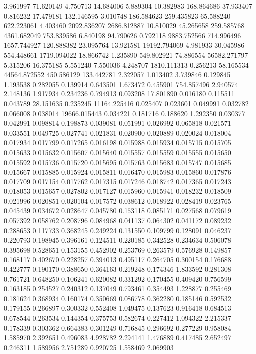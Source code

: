 3.961997
71.620149
4.750713
14.684006
5.889304
10.382983
168.864686
37.933407
0.816232
17.479181
132.146595
3.010748
186.584623
259.435823
65.588240
622.223061
4.403460
2092.836207
2686.812887
10.810029
45.265658
259.585768
4361.682049
753.839586
6.840198
94.790626
0.792118
9883.752566
714.996496
1657.744927
120.888382
23.095764
13.921581
19192.794069
4.981933
30.045986
554.448661
1719.094022
18.866742
1.235890
549.802921
74.886554
56582.271797
5.315206
16.375185
5.551240
7.550036
4.248707
1810.111313
0.256213
58.165534
44564.872552
450.586129
133.442781
2.322057
1.013402
3.739846
0.129845
1.193538
0.282055
0.139914
0.643501
1.673472
0.455901
754.857496
2.940574
2.148136
1.917934
0.234236
0.794913
0.093208
17.801890
0.016180
0.115511
0.043789
28.151635
0.235245
11164.225416
0.025407
0.023601
0.049991
0.032782
0.066008
0.038014
19666.015443
0.034221
0.181716
0.188620
1.292350
0.030377
0.042991
0.098814
0.198873
0.039081
0.051991
0.026992
0.065818
0.021571
0.033551
0.049725
0.027741
0.021831
0.020900
0.020889
0.020024
0.018004
0.017934
0.017799
0.017265
0.016198
0.015988
0.015934
0.015715
0.015705
0.015633
0.015632
0.015607
0.015640
0.015557
0.015559
0.015555
0.015650
0.015592
0.015736
0.015720
0.015695
0.015763
0.015683
0.015747
0.015685
0.015667
0.015885
0.015924
0.015811
0.016470
0.015983
0.015860
0.017876
0.017709
0.017154
0.017762
0.017315
0.017246
0.018742
0.017365
0.017243
0.018053
0.015657
0.027802
0.017127
0.015960
0.015941
0.018232
0.018509
0.021996
0.020851
0.020104
0.017572
0.038612
0.018922
0.028419
0.023765
0.045439
0.034672
0.028647
0.045780
0.163118
0.085171
0.027568
0.079619
0.057392
0.058762
0.208796
0.084968
0.041137
0.064302
0.041172
0.089232
0.288653
0.117733
0.368245
0.249224
0.131550
0.109799
0.128091
0.046237
0.220793
0.198945
0.396161
0.124511
0.220185
0.342528
0.234634
0.506078
0.395698
0.528651
0.153155
0.452902
0.253769
0.263579
0.576928
0.149857
0.168117
0.402670
0.228257
0.394013
0.495117
0.264705
0.300154
0.176688
0.422777
0.190170
0.388650
0.364163
0.219248
0.174346
1.833592
0.281308
0.761721
0.648250
0.106241
0.620082
0.331292
0.170455
0.409420
0.756599
0.163185
0.254527
0.240312
0.137049
0.793461
0.354493
1.228877
0.255469
0.181624
0.368934
0.160174
0.350669
0.086778
0.362280
0.185146
0.592532
0.179155
0.266897
0.300332
0.552408
1.049475
0.137623
0.916418
0.684513
0.678544
0.263534
0.144354
0.375753
0.582674
0.227412
1.094322
2.215337
0.178339
0.303362
0.664383
0.301249
0.716845
0.296692
0.277229
0.958084
1.585970
2.392651
0.496083
4.928782
2.294141
1.476889
0.417485
2.652497
0.246311
1.589956
2.751289
0.920725
1.558469
2.069903
